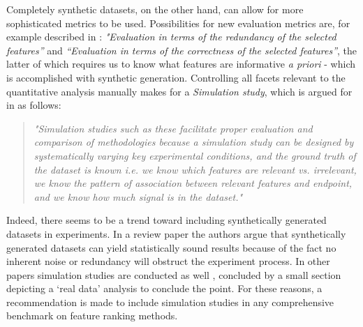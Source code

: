 \documentclass[../main.tex]{subfiles}
\begin{document}
Completely synthetic datasets, on the other hand, can allow for more sophisticated metrics to be used. Possibilities for new evaluation metrics are, for example described in \citep{solorio-fernandez_review_2020}: \textit{"Evaluation in terms of the redundancy of the selected features”} and \textit{“Evaluation in terms of the correctness of the selected features”}, the latter of which requires us to know what features are informative \textit{a priori} - which is accomplished with synthetic generation. Controlling all facets relevant to the quantitative analysis manually makes for a \textit{Simulation study}, which is argued for in \citep{urbanowicz_benchmarking_2018} as follows:

\begin{quote}
    \textit{"Simulation studies such as these facilitate proper evaluation and comparison of methodologies because a simulation study can be designed by systematically varying key experimental conditions, and the ground truth of the dataset is known i.e. we know which features are relevant vs. irrelevant, we know the pattern of association between relevant features and endpoint, and we know how much signal is in the dataset."}
\end{quote}

Indeed, there seems to be a trend toward including synthetically generated datasets in experiments. In a review paper \citep{bolon-canedo_review_2013} the authors argue that synthetically generated datasets can yield statistically sound results because of the fact no inherent noise or redundancy will obstruct the experiment process. In other papers simulation studies are conducted as well \citep{cai_online_2020} \citep{tang_high-dimensional_2020} \citep{li_distributed_2020}, concluded by a small section depicting a `real data' analysis to conclude the point. For these reasons, a recommendation is made to include simulation studies in any comprehensive benchmark on feature ranking methods.



\biblio
\end{document}
